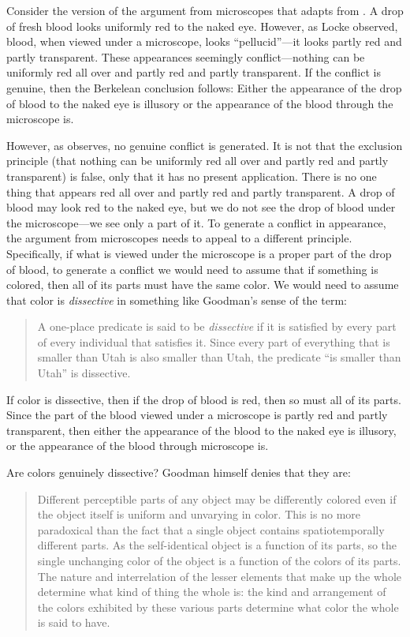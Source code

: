 \documentclass[12pt]{article}
\begin{document}
Consider the version of the argument from microscopes that \citet{Hilbert:1987jq} adapts from \citet{Marc-Wogau:1968kx}. A drop of fresh blood looks uniformly red to the naked eye. However, as Locke observed, blood, when viewed under a microscope, looks ``pellucid''---it looks partly red and partly transparent. These appearances seemingly conflict---nothing can be uniformly red all over and partly red and partly transparent. If the conflict is genuine, then the Berkelean conclusion follows: Either the appearance of the drop of blood to the naked eye is illusory or the appearance of the blood through the microscope is. 

However, as \citet{Hilbert:1987jq} observes, no genuine conflict is generated. It is not that the exclusion principle (that nothing can be uniformly red all over and partly red and partly transparent) is false, only that it has no present application. There is no one thing that appears red all over and partly red and partly transparent. A drop of blood may look red to the naked eye, but we do not see the drop of blood under the microscope---we see only a part of it. To generate a conflict in appearance, the argument from microscopes needs to appeal to a different principle. Specifically, if what is viewed under the microscope is a proper part of the drop of blood, to generate a conflict we would need to assume that if something is colored, then all of its parts must have the same color. We would need to assume that color is \emph{dissective} in something like Goodman's sense of the term:
\begin{quote}
	A one-place predicate is said to be \emph{dissective} if it is satisfied by every part of every individual that satisfies it. Since every part of everything that is smaller than Utah is also smaller than Utah, the predicate ``is smaller than Utah'' is dissective. \citep[53]{Goodman:1951ww}
\end{quote}
If color is dissective, then if the drop of blood is red, then so must all of its parts. Since the part of the blood viewed under a microscope is partly red and partly transparent, then either the appearance of the blood to the naked eye is illusory, or the appearance of the blood through microscope is.

Are colors genuinely dissective? Goodman himself denies that they are:
\begin{quote}
	Different perceptible parts of any object may be differently colored even if the object itself is uniform and unvarying in color. This is no more paradoxical than the fact that a single object contains spatiotemporally different parts. As the self-identical object is a function of its parts, so the single unchanging color of the object is a function of the colors of its parts. The nature and interrelation of the lesser elements that make up the whole determine what kind of thing the whole is: the kind and arrangement of the colors exhibited by these various parts determine what color the whole is said to have. \citep[130]{Goodman:1951ww}
\end{quote}
\end{document}
